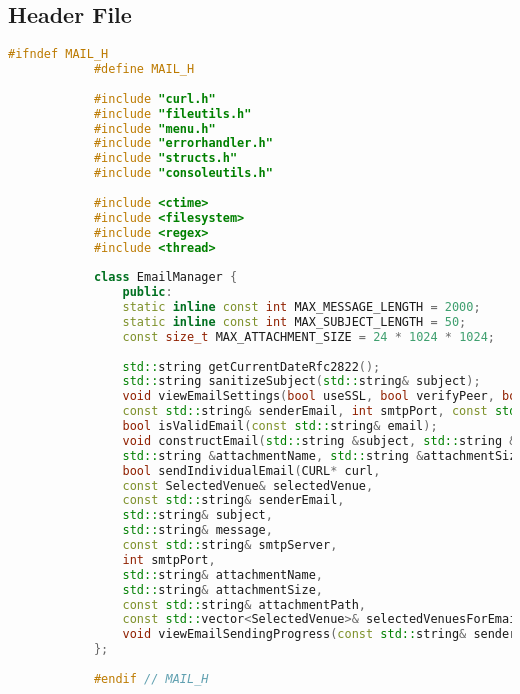 \documentclass{article}
\begin{document}
	\subsection*{Header File}
	\begin{mdframed}[backgroundcolor=background, hidealllines=false, innerleftmargin=15pt, innerrightmargin=5pt, innertopmargin=0pt, innerbottommargin=-5pt]
		\begin{lstlisting}[language=C++]
			#ifndef MAIL_H
			#define MAIL_H
			
			#include "curl.h"
			#include "fileutils.h"
			#include "menu.h"
			#include "errorhandler.h"
			#include "structs.h"
			#include "consoleutils.h"
			
			#include <ctime>
			#include <filesystem>
			#include <regex>
			#include <thread>
			
			class EmailManager {
				public:
				static inline const int MAX_MESSAGE_LENGTH = 2000;
				static inline const int MAX_SUBJECT_LENGTH = 50;
				const size_t MAX_ATTACHMENT_SIZE = 24 * 1024 * 1024;
				
				std::string getCurrentDateRfc2822();
				std::string sanitizeSubject(std::string& subject);
				void viewEmailSettings(bool useSSL, bool verifyPeer, bool verifyHost, bool verbose,
				const std::string& senderEmail, int smtpPort, const std::string& smtpServer);
				bool isValidEmail(const std::string& email);
				void constructEmail(std::string &subject, std::string &message, std::string &attachmentPath, 
				std::string &attachmentName, std::string &attachmentSize, std::istream &in = std::cin);
				bool sendIndividualEmail(CURL* curl,
				const SelectedVenue& selectedVenue,
				const std::string& senderEmail,
				std::string& subject,
				std::string& message,
				const std::string& smtpServer,
				int smtpPort,
				std::string& attachmentName,
				std::string& attachmentSize,
				const std::string& attachmentPath,
				const std::vector<SelectedVenue>& selectedVenuesForEmail);
				void viewEmailSendingProgress(const std::string& senderEmail);
			};
			
			#endif // MAIL_H
		\end{lstlisting}
	\end{mdframed}
	
\end{document}
